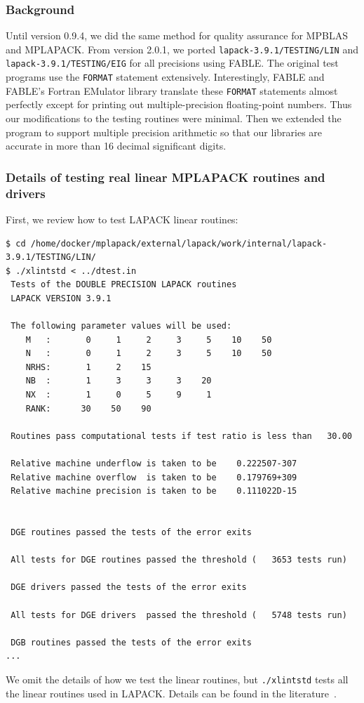 \documentclass[12pt]{article}
\begin{document}
\subsubsection{Background}
Until version 0.9.4, we did the same method for quality assurance for MPBLAS and MPLAPACK. From version 2.0.1, we ported {\tt lapack-3.9.1/TESTING/LIN} and {\tt lapack-3.9.1/TESTING/EIG} for all precisions using FABLE. The original test programs
use the {\tt FORMAT} statement extensively. Interestingly, FABLE and FABLE's Fortran EMulator library translate these {\tt FORMAT} statements almost perfectly except for printing out multiple-precision floating-point numbers. Thus our modifications to the testing routines were minimal.
Then we extended the program to support multiple precision arithmetic so that our libraries are accurate in more than 16 decimal significant digits.

\subsubsection{Details of testing real linear MPLAPACK routines and drivers}
First, we review how to test LAPACK linear routines:
\begin{verbatim}
$ cd /home/docker/mplapack/external/lapack/work/internal/lapack-3.9.1/TESTING/LIN/
$ ./xlintstd < ../dtest.in
 Tests of the DOUBLE PRECISION LAPACK routines
 LAPACK VERSION 3.9.1

 The following parameter values will be used:
    M   :       0     1     2     3     5    10    50
    N   :       0     1     2     3     5    10    50
    NRHS:       1     2    15
    NB  :       1     3     3     3    20
    NX  :       1     0     5     9     1
    RANK:      30    50    90

 Routines pass computational tests if test ratio is less than   30.00

 Relative machine underflow is taken to be    0.222507-307
 Relative machine overflow  is taken to be    0.179769+309
 Relative machine precision is taken to be    0.111022D-15


 DGE routines passed the tests of the error exits

 All tests for DGE routines passed the threshold (   3653 tests run)

 DGE drivers passed the tests of the error exits

 All tests for DGE drivers  passed the threshold (   5748 tests run)

 DGB routines passed the tests of the error exits
...
\end{verbatim}
We omit the details of how we test the linear routines, but {\tt ./xlintstd} tests all the linear routines used in LAPACK.
Details can be found in the literature~\cite{lawn41}.
\end{document}
